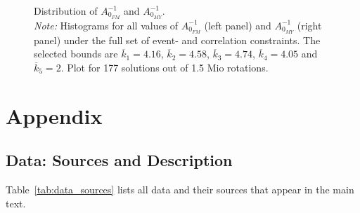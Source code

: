\documentclass[a4paper,11pt,listof=nochaptergap,oneside,pointednumbers,bibtotoc,bigheadings,liststotoc,hidelinks]{scrbook}
\theoremstyle{mysatz}
\theoremstyle{mydefinition}
\theoremstyle{mytheorem}
\theoremstyle{mybemerkung}
\begin{document}
\begin{figure}[!h]
   \centering
   \setlength\fboxsep{0pt}
   \setlength\fboxrule{0pt}
      \caption[Distribution of $A_{0_{FM}}^{-1}$ and $A_{0_{MY}}^{-1}$.]{Distribution of $A_{0_{FM}}^{-1}$ and $A_{0_{MY}}^{-1}$.\\
      \textit{Note:} Histograms for all values of $A_{0_{FM}}^{-1}$ (left panel) and $A_{0_{MY}}^{-1}$ (right panel) under the full set of event- and correlation constraints. The selected bounds are $\overline{k}_1 = 4.16$, $\overline{k}_2 = 4.58$, $\overline{k}_3 = 4.74$, $\overline{k}_4 = 4.05$ and $\overline{k}_5 = 2$. Plot for 177 solutions out of 1.5 Mio rotations.}   \label{fig:distribution_impact_matrices_type3}
\end{figure}





\chapter{Appendix}
\label{DataAndCode}
\section{Data: Sources and Description}
\label{sec:dataAppendix}
Table~\ref{tab:data_sources} lists all data and their sources that appear in the main text.
\vspace*{350px}
\end{document}
